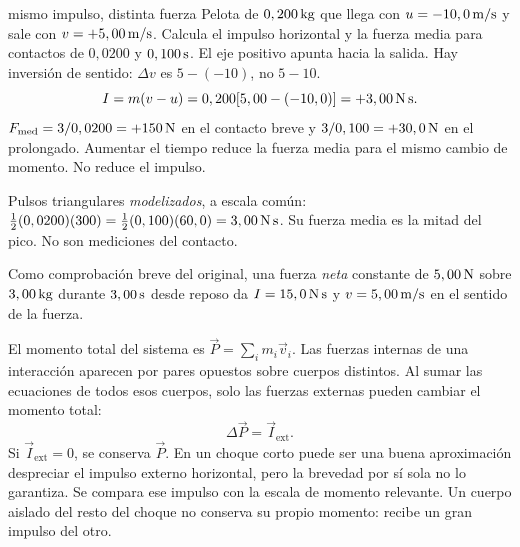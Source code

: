 \documentclass[11pt,a4paper]{article}
\begin{document}
\begin{examplebox}{mismo impulso, distinta fuerza}
 Pelota de $0,200\,\mathrm{kg}$ que llega con $u=-10,0\,\mathrm{m/s}$
y sale con $v=+5,00\,\mathrm{m/s}$. Calcula el impulso horizontal y la fuerza media
para contactos de $0,0200$ y $0,100\,\mathrm{s}$.
\solutionblock
{} El eje positivo apunta hacia la salida. Hay inversi\'on de sentido:
$\Delta v$ es $5-(-10)$, no $5-10$.
\[
I=m(v-u)=0,200[5,00-(-10,0)]=+3,00\,\mathrm{N\,s}.
\]
$F_{\mathrm{med}}=3/0,0200=+150\,\mathrm{N}$ en el contacto breve y
$3/0,100=+30,0\,\mathrm{N}$ en el prolongado.
 Aumentar el tiempo reduce la fuerza media para el mismo
cambio de momento. No reduce el impulso.
\begin{center}
\end{center}
Pulsos triangulares \emph{modelizados}, a escala com\'un:
$\tfrac12(0,0200)(300)=\tfrac12(0,100)(60,0)=3,00\,\mathrm{N\,s}$.
Su fuerza media es la mitad del pico. No son mediciones del contacto.
\end{examplebox}

Como comprobaci\'on breve del original, una fuerza \emph{neta} constante de
$5,00\,\mathrm{N}$ sobre $3,00\,\mathrm{kg}$ durante $3,00\,\mathrm{s}$ desde reposo da
$I=15,0\,\mathrm{N\,s}$ y $v=5,00\,\mathrm{m/s}$ en el sentido de la fuerza.

El momento total del sistema es $\vec P=\sum_i m_i\vec v_i$.
Las fuerzas internas de una interacci\'on aparecen por pares opuestos sobre
cuerpos distintos. Al sumar las ecuaciones de todos esos cuerpos,
solo las fuerzas externas pueden cambiar el momento total:
\[
\Delta\vec P=\vec I_{\mathrm{ext}}.
\]
Si $\vec I_{\mathrm{ext}}=0$, se conserva $\vec P$. En un choque corto puede
ser una buena aproximaci\'on despreciar el impulso externo horizontal, pero
la brevedad por s\'i sola no lo garantiza. Se compara ese impulso con la escala de
momento relevante. Un cuerpo aislado del resto del choque no conserva su propio
momento: recibe un gran impulso del otro.
\end{document}
